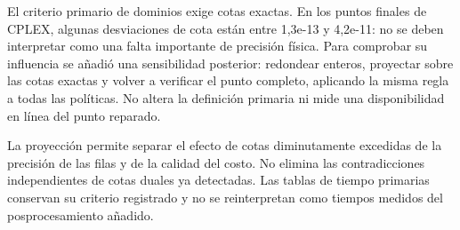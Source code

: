 \documentclass[a4paper,10pt]{article}
\begin{document}
\begin{center}\small{}\end{center}

El criterio primario de dominios exige cotas exactas. En los puntos finales
de CPLEX, algunas desviaciones de cota están entre 1,3e-13 y 4,2e-11:
no se deben interpretar como una falta importante de precisión física.
Para comprobar su influencia se añadió una sensibilidad posterior: redondear
enteros, proyectar sobre las cotas exactas y volver a verificar el punto
completo, aplicando la misma regla a todas las políticas. No altera la
definición primaria ni mide una disponibilidad en línea del punto reparado.

\begin{center}\small{}\end{center}

La proyección permite separar el efecto de cotas diminutamente excedidas
de la precisión de las filas y de la calidad del costo. No elimina las
contradicciones independientes de cotas duales ya detectadas. Las tablas
de tiempo primarias conservan su criterio registrado y no se reinterpretan
como tiempos medidos del posprocesamiento añadido.
\end{document}
